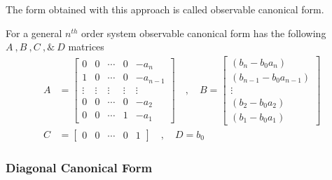 \documentclass[twoside]{article}
\begin{document}
The form obtained with this approach is called
observable canonical form. 

For a general $n^{th}$ order system observable
canonical form has the following $A \ ,  B \ ,  C \ , \& \ D$
matrices
%
\begin{align*}
A &= \left[ \begin{array}{ccccc} 0 & 0 & \cdots & 0 & -a_{n} 
              \\ 1 & 0 & \cdots & 0 & -a_{n-1} 
\\ \vdots & \vdots & \vdots & \vdots & \vdots
\\ 0 & 0 & \cdots & 0 & -a_2
    \\ 0 & 0 & \cdots & 1 & -a_1 \end{array} \right]
\quad , \quad 
B = \left[ \begin{array}{c} (b_n - b_0 a_n)  \\ (b_{n-1} - b_0
             a_{n-1}) \\ \vdots \\ (b_2 - b_0 a_2) \\   (b_1 - b_0
             a_1) 
\end{array} \right]
\\ C &= \left[ \begin{array}{ccccc} 0 & 0 & \cdots &  0 & 1 \end{array} \right]
\quad , \quad
D = b_0
\end{align*}
%
\subsubsection*{Diagonal Canonical Form}
\end{document}
